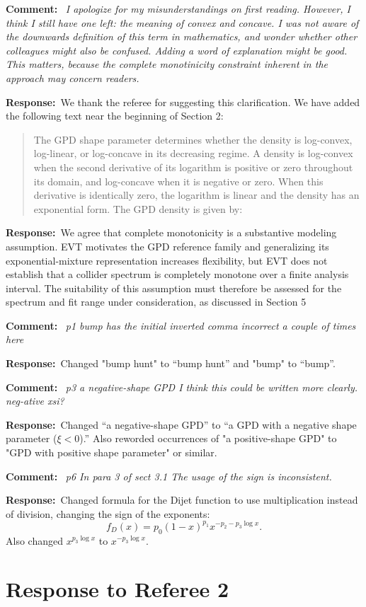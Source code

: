 \documentclass[11pt,a4paper]{article}
\newcommand{\refcomment}[1]{%
    \medskip\noindent\textbf{\color{refcolor}Comment:}\ %
    {\itshape #1}\par\smallskip
}
\newcommand{\response}{\noindent\textbf{Response:}\ }
\newcommand{\addedtext}[1]{%
    \smallskip\begin{quote}\color{quotecolor}\small #1\end{quote}\smallskip
}
\begin{document}
\refcomment{I apologize for my misunderstandings on first reading. However, I think I
still have one left: the meaning of convex and concave. I was not aware of the downwards definition of this term in mathematics, and wonder whether other colleagues might also be confused. Adding a word of explanation might be good. This matters, because the complete monotinicity constraint inherent in the approach may concern readers.}
\response We thank the referee for suggesting this clarification. We have added the following text near the beginning of Section 2:
\addedtext{The GPD shape parameter determines whether the density is log-convex, log-linear, or log-concave in its decreasing regime. A density is log-convex when the second derivative of its logarithm is positive or zero throughout its domain, and log-concave when it is negative or zero. When this derivative is identically zero, the logarithm is linear and the density has an exponential form. The GPD density is given by:}

\response We agree that complete monotonicity is a substantive modeling assumption. EVT motivates the GPD reference family and generalizing its exponential-mixture representation increases flexibility, but EVT does not establish that a collider spectrum is completely monotone over a finite analysis interval. The suitability of this assumption must therefore be assessed for the spectrum and fit range under consideration, as discussed in Section 5


\refcomment{p1 bump has the initial inverted comma incorrect a couple of times here}
\response Changed "bump hunt" to ``bump hunt'' and "bump" to ``bump''.

\refcomment{p3 a negative-shape GPD I think this could be written more clearly. neg-ative xsi?}
\response Changed ``a negative-shape GPD'' to ``a GPD with a negative shape parameter ($\xi<0$).'' Also reworded occurrences of "a positive-shape GPD" to "GPD with positive shape parameter" or similar.

\refcomment{p6 In para 3 of sect 3.1 The usage of the sign is inconsistent.}
\response Changed formula for the Dijet function to use multiplication instead of division, changing the sign of the exponents:
\begin{equation}
f_D(x) = p_0(1-x)^{p_1}x^{-p_2-p_3\log x}.
\end{equation}
Also changed $x^{p_3\log x}$ to  $x^{-p_3\log x}$.

\clearpage
\section*{Response to Referee 2}
\end{document}
